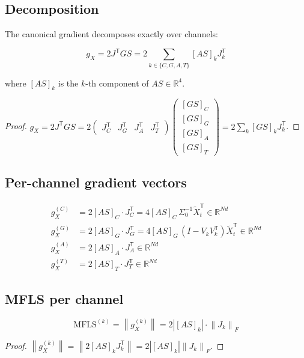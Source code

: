 \documentclass[11pt,a4paper]{article}
\theoremstyle{definition}
\newcommand{\R}{\mathbb{R}}
\newcommand{\T}{^{\mathsf{T}}}
\newcommand{\norm}[1]{\left\|#1\right\|}
\newcommand{\gX}{g_X}
\newcommand{\mfls}{\mathrm{MFLS}}
\begin{document}
\subsection{Decomposition}

The canonical gradient decomposes exactly over channels:

\begin{lockedbox}
\[
\gX = 2J\T GS = 2\sum_{k\in\{C,G,A,T\}} [AS]_k J_k\T
\]
\end{lockedbox}

where $[AS]_k$ is the $k$-th component of $AS \in \R^4$.

\begin{proof}
$\gX = 2J\T GS = 2\begin{pmatrix}J_C\T & J_G\T & J_A\T & J_T\T\end{pmatrix}
\begin{pmatrix}[GS]_C \\ [GS]_G \\ [GS]_A \\ [GS]_T\end{pmatrix}
= 2\sum_k [GS]_k J_k\T$.
\end{proof}

\subsection{Per-channel gradient vectors}

\begin{align*}
\gX^{(C)} &= 2[AS]_C \cdot J_C\T = 4[AS]_C\,\Sigma_0^{-1}\tilde X_t\T \in \R^{Nd} \\[4pt]
\gX^{(G)} &= 2[AS]_G \cdot J_G\T = 4[AS]_G\,(I-V_kV_k\T)\tilde X_t\T \in \R^{Nd} \\[4pt]
\gX^{(A)} &= 2[AS]_A \cdot J_A\T \in \R^{Nd} \\[4pt]
\gX^{(T)} &= 2[AS]_T \cdot J_T\T \in \R^{Nd}
\end{align*}

\subsection{MFLS per channel}

\begin{lockedbox}
\[
\mfls^{(k)} = \norm{\gX^{(k)}} = 2|[AS]_k|\cdot\norm{J_k}_F
\]
\end{lockedbox}

\begin{proof}
$\norm{\gX^{(k)}} = \norm{2[AS]_k J_k\T} = 2|[AS]_k|\norm{J_k}_F$.
\end{proof}
\end{document}
